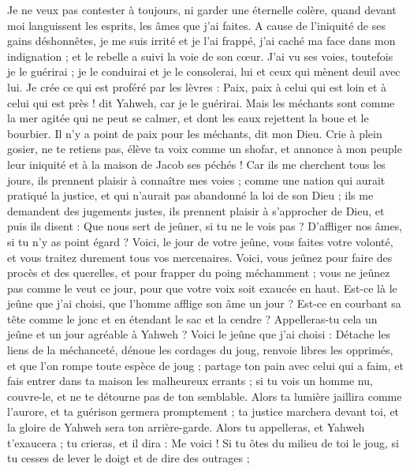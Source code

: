 \begin{multicols}{2}
Je ne veux pas contester à toujours, ni garder une éternelle colère, quand devant moi languissent les esprits, les âmes que j'ai faites.
A cause de l'iniquité de ses gains déshonnêtes, je me suis irrité et je l'ai frappé, j'ai caché ma face dans mon indignation ; et le rebelle a suivi la voie de son cœur.
J'ai vu ses voies, toutefois je le guérirai ; je le conduirai et je le consolerai, lui et ceux qui mènent deuil avec lui.
Je crée ce qui est proféré par les lèvres : Paix, paix à celui qui est loin et à celui qui est près ! dit Yahweh, car je le guérirai.
Mais les méchants sont comme la mer agitée qui ne peut se calmer, et dont les eaux rejettent la boue et le bourbier.
Il n'y a point de paix pour les méchants, dit mon Dieu.
\VerseOne{}Crie à plein gosier, ne te retiens pas, élève ta voix comme un shofar, et annonce à mon peuple leur iniquité et à la maison de Jacob ses péchés !
Car ils me cherchent tous les jours, ils prennent plaisir à connaître mes voies ; comme une nation qui aurait pratiqué la justice, et qui n'aurait pas abandonné la loi de son Dieu ; ils me demandent des jugements justes, ils prennent plaisir à s'approcher de Dieu, et puis ils disent :
Que nous sert de jeûner, si tu ne le vois pas ? D'affliger nos âmes, si tu n'y as point égard ? Voici, le jour de votre jeûne, vous faites votre volonté, et vous traitez durement tous vos mercenaires.
Voici, vous jeûnez pour faire des procès et des querelles, et pour frapper du poing méchamment ; vous ne jeûnez pas comme le veut ce jour, pour que votre voix soit exaucée en haut.
Est-ce là le jeûne que j'ai choisi, que l'homme afflige son âme un jour ? Est-ce en courbant sa tête comme le jonc et en étendant le sac et la cendre ? Appelleras-tu cela un jeûne et un jour agréable à Yahweh ?
Voici le jeûne que j'ai choisi : Détache les liens de la méchanceté, dénoue les cordages du joug, renvoie libres les opprimés, et que l'on rompe toute espèce de joug ;
partage ton pain avec celui qui a faim, et fais entrer dans ta maison les malheureux errants ; si tu vois un homme nu, couvre-le, et ne te détourne pas de ton semblable.
Alors ta lumière jaillira comme l'aurore, et ta guérison germera promptement ; ta justice marchera devant toi, et la gloire de Yahweh sera ton arrière-garde.
Alors tu appelleras, et Yahweh t'exaucera ; tu crieras, et il dira : Me voici ! Si tu ôtes du milieu de toi le joug, si tu cesses de lever le doigt et de dire des outrages ;

\end{multicols}
